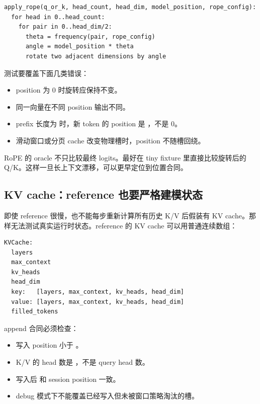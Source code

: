 \begin{lstlisting}[numbers=none,caption={RoPE reference 合同}]
apply_rope(q_or_k, head_count, head_dim, model_position, rope_config):
  for head in 0..head_count:
    for pair in 0..head_dim/2:
      theta = frequency(pair, rope_config)
      angle = model_position * theta
      rotate two adjacent dimensions by angle
\end{lstlisting}

测试要覆盖下面几类错误：

\begin{itemize}
  \item position 为 0 时旋转应保持不变。
  \item 同一向量在不同 position 输出不同。
  \item prefix 长度为  时，新 token 的 position 是 ，不是 0。
  \item 滑动窗口或分页 cache 改变物理槽时，position 不随槽回绕。
\end{itemize}

RoPE 的 oracle 不只比较最终 logits。最好在 tiny fixture 里直接比较旋转后的 Q/K。这样一旦长上下文漂移，可以更早定位到位置合同。

\subsection{KV cache：reference 也要严格建模状态}

即使 reference 很慢，也不能每步重新计算所有历史 K/V 后假装有 KV cache。那样无法测试真实运行时状态。reference 的 KV cache 可以用普通连续数组：

\begin{lstlisting}[numbers=none,caption={KV cache reference 字段}]
KVCache:
  layers
  max_context
  kv_heads
  head_dim
  key:   [layers, max_context, kv_heads, head_dim]
  value: [layers, max_context, kv_heads, head_dim]
  filled_tokens
\end{lstlisting}

append 合同必须检查：

\begin{itemize}
  \item 写入 position 小于 。
  \item K/V 的 head 数是 ，不是 query head 数。
  \item 写入后  和 session position 一致。
  \item debug 模式下不能覆盖已经写入但未被窗口策略淘汰的槽。
\end{itemize}

